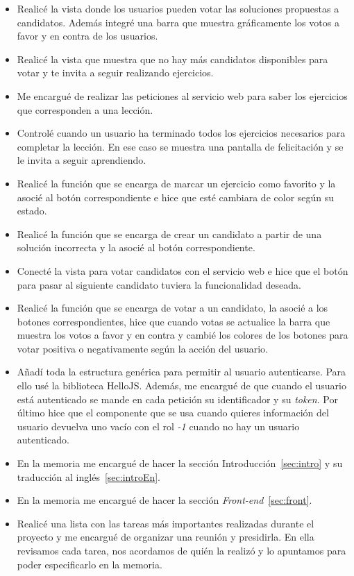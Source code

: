 \begin{itemize}
\item
Realicé la vista donde los usuarios pueden votar las soluciones propuestas a candidatos. Además integré una barra que muestra gráficamente los votos a favor y en contra de los usuarios.

\item 
Realicé la vista que muestra que no hay más candidatos disponibles para votar y te invita a seguir realizando ejercicios.

\item
Me encargué de realizar las peticiones al servicio web para saber los ejercicios que corresponden a una lección.

\item
Controlé cuando un usuario ha terminado todos los ejercicios necesarios para completar la lección. En ese caso se muestra una pantalla de felicitación y se le invita a seguir aprendiendo.

\item
Realicé la función que se encarga de marcar un ejercicio como favorito y la asocié al botón correspondiente e hice que esté cambiara de color según su estado.

\item
Realicé la función que se encarga de crear un candidato a partir de una solución incorrecta y la asocié al botón correspondiente.

\item
Conecté la vista para votar candidatos con el servicio web e hice que el botón para pasar al siguiente candidato tuviera la funcionalidad deseada.

\item
Realicé la función que se encarga de votar a un candidato, la asocié a los botones correspondientes, hice que cuando votas se actualice la barra que muestra los votos a favor y en contra y cambié los colores de los botones para votar positiva o negativamente según la acción del usuario.

\item
Añadí toda la estructura genérica para permitir al usuario autenticarse. Para ello usé la biblioteca HelloJS. Además, me encargué de que cuando el usuario está autenticado se mande en cada petición su identificador y su \emph{token}. Por último hice que el componente que se usa cuando quieres información del usuario devuelva uno vacío con el rol \emph{-1} cuando no hay un usuario autenticado.


\item
En la memoria me encargué de hacer la sección Introducción~\ref{sec:intro} y su traducción al inglés~\ref{sec:introEn}.

\item
En la memoria me encargué de hacer la sección \emph{Front-end}~\ref{sec:front}.

\item
Realicé una lista con las tareas más importantes realizadas durante el proyecto y me encargué de organizar una reunión y presidirla. En ella revisamos cada tarea, nos acordamos de quién la realizó y lo apuntamos para poder especificarlo en la memoria.

\end{itemize}